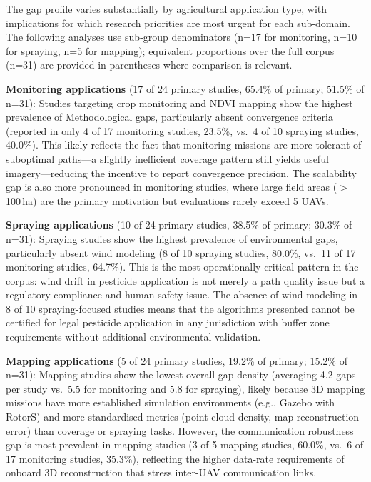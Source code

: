 \documentclass[review,3p,times]{elsarticle}
\begin{document}
\begin{itemize}
{The gap profile varies substantially by agricultural application type, with implications for which research priorities are most urgent for each sub-domain. The following analyses use sub-group denominators (n=17 for monitoring, n=10 for spraying, n=5 for mapping); equivalent proportions over the full corpus (n=31) are provided in parentheses where comparison is relevant.

\textbf{Monitoring applications} (17 of 24 primary studies, 65.4\% of primary; 51.5\% of n=31): Studies targeting crop monitoring and NDVI mapping show the highest prevalence of Methodological gaps, particularly absent convergence criteria (reported in only 4 of 17 monitoring studies, 23.5\%, vs.\ 4 of 10 spraying studies, 40.0\%). This likely reflects the fact that monitoring missions are more tolerant of suboptimal paths---a slightly inefficient coverage pattern still yields useful imagery---reducing the incentive to report convergence precision. The scalability gap is also more pronounced in monitoring studies, where large field areas ($>$100\,ha) are the primary motivation but evaluations rarely exceed 5 UAVs.

\textbf{Spraying applications} (10 of 24 primary studies, 38.5\% of primary; 30.3\% of n=31): Spraying studies show the highest prevalence of environmental gaps, particularly absent wind modeling (8 of 10 spraying studies, 80.0\%, vs.\ 11 of 17 monitoring studies, 64.7\%). This is the most operationally critical pattern in the corpus: wind drift in pesticide application is not merely a path quality issue but a regulatory compliance and human safety issue. The absence of wind modeling in 8 of 10 spraying-focused studies means that the algorithms presented cannot be certified for legal pesticide application in any jurisdiction with buffer zone requirements without additional environmental validation.

\textbf{Mapping applications} (5 of 24 primary studies, 19.2\% of primary; 15.2\% of n=31): Mapping studies show the lowest overall gap density (averaging 4.2 gaps per study vs.\ 5.5 for monitoring and 5.8 for spraying), likely because 3D mapping missions have more established simulation environments (e.g., Gazebo with RotorS) and more standardised metrics (point cloud density, map reconstruction error) than coverage or spraying tasks. However, the communication robustness gap is most prevalent in mapping studies (3 of 5 mapping studies, 60.0\%, vs.\ 6 of 17 monitoring studies, 35.3\%), reflecting the higher data-rate requirements of onboard 3D reconstruction that stress inter-UAV communication links.

}
\end{itemize}
\end{document}
